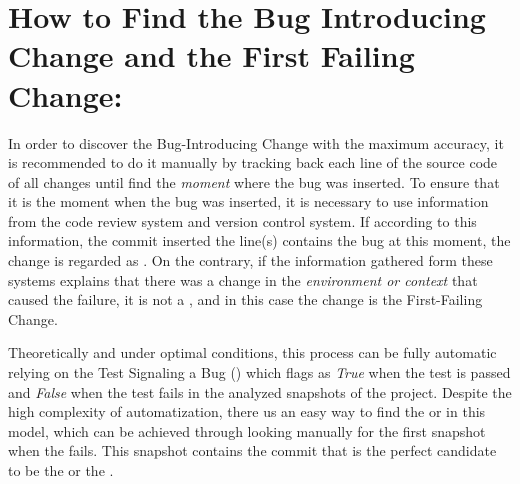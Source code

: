 \documentclass[a4paper, 12pt]{book}
\begin{document}


\section{How to Find the Bug Introducing Change and the First Failing Change:}
In order to discover the Bug-Introducing Change with the maximum accuracy, it is recommended to do it manually by tracking back each line of the source code of all changes until find the \emph{moment} where the bug was inserted. To ensure that it is the moment when the bug was inserted, it is necessary to use information from the code review system and version control system. If according to this information, the commit inserted the line(s) contains the bug at this moment, the change is regarded as \BIC. On the contrary, if the information gathered form these systems explains that there was a change in the \emph{environment or context} that caused the failure, it is not a \BIC, and in this case the change is the First-Failing Change. 

Theoretically and under optimal conditions, this process can be fully automatic relying on the Test Signaling a Bug (\TSB) which flags as \emph{True} when the test is passed and \emph{False} when the test fails in the analyzed snapshots of the project. Despite the high complexity of automatization, there us an easy way to find the \BIC or \FFC in this model, which can be achieved through looking manually for the first snapshot when the \TSB fails. This snapshot contains the commit that is the perfect candidate to be the \BIC or the \FFC.
\end{document}
